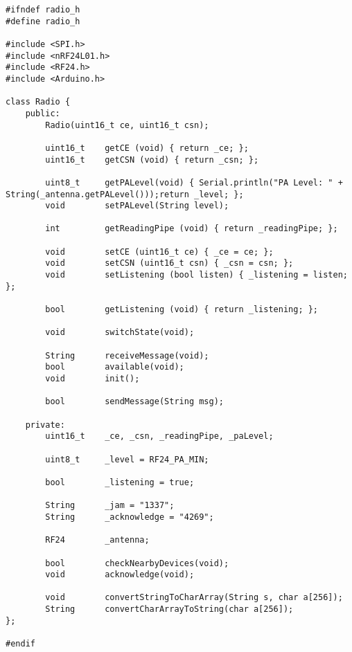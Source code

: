 \documentclass[a4paper, 11pt]{scrartcl}
\begin{document}
\begin{lstlisting}
#ifndef radio_h
#define radio_h

#include <SPI.h>
#include <nRF24L01.h>
#include <RF24.h>
#include <Arduino.h>

class Radio {
    public:
        Radio(uint16_t ce, uint16_t csn);

        uint16_t    getCE (void) { return _ce; };
        uint16_t    getCSN (void) { return _csn; };

        uint8_t     getPALevel(void) { Serial.println("PA Level: " + String(_antenna.getPALevel()));return _level; };
        void        setPALevel(String level);

        int         getReadingPipe (void) { return _readingPipe; };

        void        setCE (uint16_t ce) { _ce = ce; };
        void        setCSN (uint16_t csn) { _csn = csn; };
        void        setListening (bool listen) { _listening = listen; };

        bool        getListening (void) { return _listening; };

        void        switchState(void);

        String      receiveMessage(void);
        bool        available(void);
        void        init();

        bool        sendMessage(String msg);

    private:
        uint16_t    _ce, _csn, _readingPipe, _paLevel;
        
        uint8_t     _level = RF24_PA_MIN;

        bool        _listening = true;

        String      _jam = "1337";
        String      _acknowledge = "4269";

        RF24        _antenna;

        bool        checkNearbyDevices(void);
        void        acknowledge(void);

        void        convertStringToCharArray(String s, char a[256]);
        String      convertCharArrayToString(char a[256]);
};

#endif
\end{lstlisting}
\end{document}
